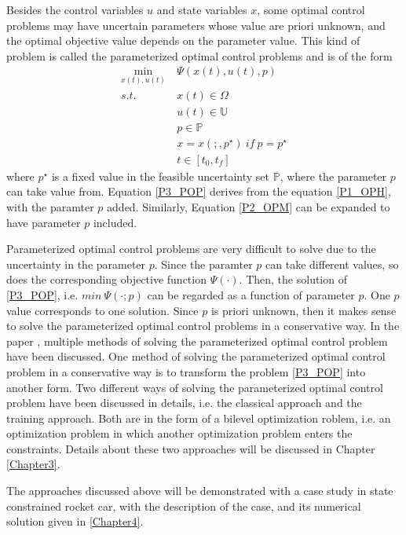\documentclass  [
  paper    = a4,
  BCOR     = 10mm,
  twoside,
  fontsize = 12pt,
  fleqn,
  toc      = bibnumbered,
  toc      = listofnumbered,
  numbers  = noendperiod,
  headings = normal,
  listof   = leveldown,
  version  = 3.03
]                                       {scrreprt}
\newcommand{\<}{\langle}
\renewcommand{\>}{\rangle}
\begin{document}
Besides the control variables $u$ and state variables $x$, some optimal control problems may have  uncertain parameters whose value are priori unknown, and the optimal objective value depends on the parameter value. This kind of problem is called the parameterized optimal control problems and is of the form 
      \begin{equation}
   	\begin{aligned}
	\underset{x(t), u(t)}{\text{min}}  \ &  \Psi(x(t), u(t), p) \\
	s.t.\ \  & x(t) \in \Omega \\
	& u(t) \in \mathbb{U}  \\
	& p  \in   \mathbb{P}  \\
	& x = x(;,p^\star) \ if \ p = p^\star \\
	& t \in [t_0, t_f]
\end{aligned}
\label{P3_POP}
\end{equation}
where $p^\star$ is a fixed value in the feasible uncertainty set $ \mathbb{P}$, where the parameter $p$ can take value from. Equation \ref{P3_POP} derives from the equation \ref{P1_OPH}, with the paramter $p$ added.  Similarly, Equation \ref{P2_OPM} can be expanded to have parameter $p$ included.  

Parameterized optimal control problems are very difficult to solve due to the uncertainty in the parameter $p$. Since the paramter $p$ can take different values, so does the corresponding  objective function $\Psi(\cdot)$. Then, the solution of \ref{P3_POP},  i.e. $min \  \Psi(\cdot; p)$ can be regarded as a function of parameter $p$. One $p$ value corresponds to one solution. Since $p$ is priori unknown, then it makes sense to solve the parameterized optimal control problems in a conservative way. In the paper \cite{MatSch22}, multiple methods of solving the parameterized optimal control problem have been discussed. One method  of solving the parameterized optimal control problem in a conservative way is to transform the problem \ref{P3_POP} into another form. Two different ways of solving the parameterized optimal control problem have been discussed in details, i.e. the classical approach and the training approach. Both are in the form of a bilevel optimization roblem, i.e. an optimization problem in which another optimization problem enters the constraints. Details about these two approaches will be discussed in Chapter \ref{Chapter3}. 

The approaches discussed above will be demonstrated with a case study in state constrained rocket car, with the description of the case, and its numerical solution given in \ref{Chapter4}.  
\end{document}
